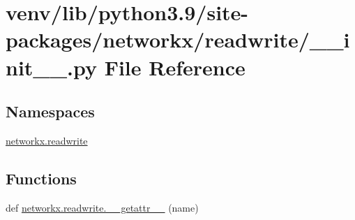 \hypertarget{venv_2lib_2python3_89_2site-packages_2networkx_2readwrite_2____init_____8py}{}\section{venv/lib/python3.9/site-\/packages/networkx/readwrite/\+\_\+\+\_\+init\+\_\+\+\_\+.py File Reference}
\label{venv_2lib_2python3_89_2site-packages_2networkx_2readwrite_2____init_____8py}
\subsection*{Namespaces}
\begin{DoxyCompactItemize}
\item 
 \hyperlink{namespacenetworkx_1_1readwrite}{networkx.\+readwrite}
\end{DoxyCompactItemize}
\subsection*{Functions}
\begin{DoxyCompactItemize}
\item 
def \hyperlink{namespacenetworkx_1_1readwrite_a4686bfe2cc0a399e43960c07d3488586}{networkx.\+readwrite.\+\_\+\+\_\+getattr\+\_\+\+\_\+} (name)
\end{DoxyCompactItemize}
